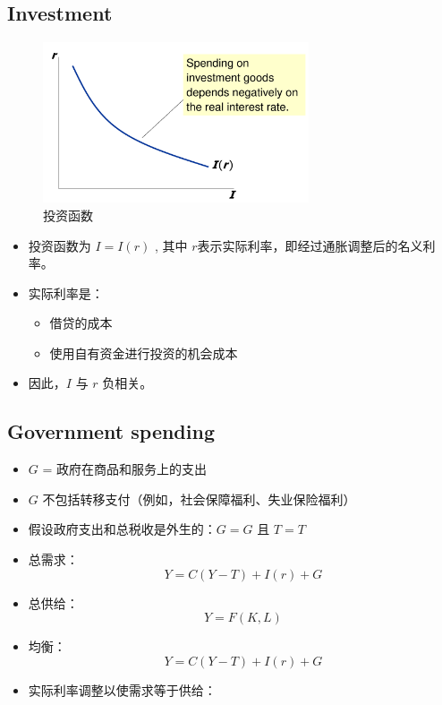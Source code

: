 \subsection{Investment}
\begin{figure}[htbp]
    \centering
    \includegraphics[width=0.7\textwidth]{image/Investmentfunction.png}
    \caption{投资函数}
\end{figure}
\begin{itemize}
    \item 投资函数为
    $
    I = I(r)
    $
    , 其中 $ r $表示实际利率，即经过通胀调整后的名义利率。
    
    \item 实际利率是：
    \begin{itemize}
        \item 借贷的成本
        \item 使用自有资金进行投资的机会成本
    \end{itemize}
    
    \item 因此，$ I $ 与 $ r $ 负相关。
\end{itemize}
\subsection{Government spending}
\begin{itemize}
    \item $G$ = 政府在商品和服务上的支出
    \item $G$ 不包括转移支付（例如，社会保障福利、失业保险福利）
    \item 假设政府支出和总税收是外生的：$G = G$ 且 $T = T$
\end{itemize}

\begin{proposition}[商品和服务市场]
    \begin{itemize}
        \item 总需求：
        $$
        Y = C(Y - T) + I(r) + G
        $$
        \item 总供给：
        $$
        Y = F(K, L)
        $$
        \item 均衡：
        $$
        Y = C(Y - T) + I(r) + G
        $$
        \item 实际利率调整以使需求等于供给：
    \end{itemize}
\end{proposition}

